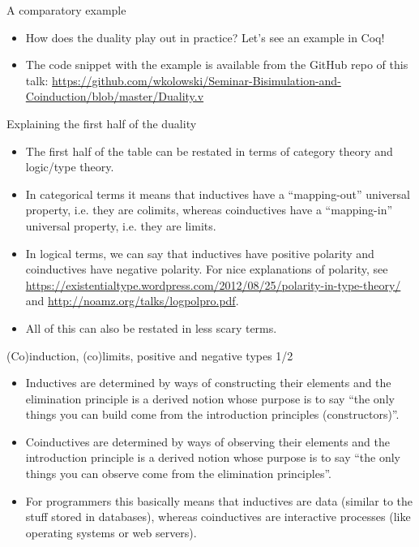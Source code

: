 \documentclass{beamer}
\begin{document}
\begin{frame}{A comparatory example}
\begin{itemize}
	\item How does the duality play out in practice? Let's see an example in Coq!
	\item The code snippet with the example is available from the GitHub repo of this talk: \url{https://github.com/wkolowski/Seminar-Bisimulation-and-Coinduction/blob/master/Duality.v}
\end{itemize}
\end{frame}

\begin{frame}{Explaining the first half of the duality}
\begin{itemize}
	\item The first half of the table can be restated in terms of category theory and logic/type theory.
	\item In categorical terms it means that inductives have a ``mapping-out'' universal property, i.e. they are colimits, whereas coinductives have a ``mapping-in'' universal property, i.e. they are limits.
	\item In logical terms, we can say that inductives have positive polarity and coinductives have negative polarity. For nice explanations of polarity, see \url{https://existentialtype.wordpress.com/2012/08/25/polarity-in-type-theory/} and \url{http://noamz.org/talks/logpolpro.pdf}.
	\item All of this can also be restated in less scary terms.
\end{itemize}
\end{frame}

\begin{frame}{(Co)induction, (co)limits, positive and negative types 1/2}
\begin{itemize}
	\item Inductives are determined by ways of constructing their elements and the elimination principle is a derived notion whose purpose is to say ``the only things you can build come from the introduction principles (constructors)''.
	\item Coinductives are determined by ways of observing their elements and the introduction principle is a derived notion whose purpose is to say ``the only things you can observe come from the elimination principles''.
	\item For programmers this basically means that inductives are data (similar to the stuff stored in databases), whereas coinductives are interactive processes (like operating systems or web servers).
\end{itemize}
\end{frame}
\end{document}
